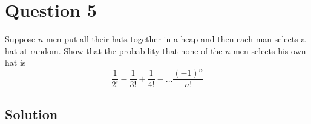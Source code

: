 \section*{Question 5}

Suppose \(n\) men put all their hats together in a heap and then each man selects a hat at random.
Show that the probability that none of the \(n\) men selects his own hat is
\[
    \frac{1}{2!} - \frac{1}{3!} + \frac{1}{4!} - \dots \frac{{(-1)}^n}{n!}
\]

\subsection*{Solution}
